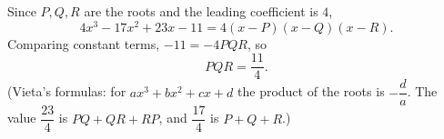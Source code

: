 Since $P,Q,R$ are the roots and the leading coefficient is $4$,
\[
4x^3-17x^2+23x-11=4(x-P)(x-Q)(x-R).
\]
Comparing constant terms, $-11=-4PQR$, so
\[
PQR=\boxed{\dfrac{11}{4}} .
\]
(Vieta's formulas: for $ax^3+bx^2+cx+d$ the product of the roots is $-\dfrac {d}{a}$. The value $\dfrac{23}{4}$ is $PQ+QR+RP$, and $\dfrac{17}{4}$ is $P+Q+R$.)
